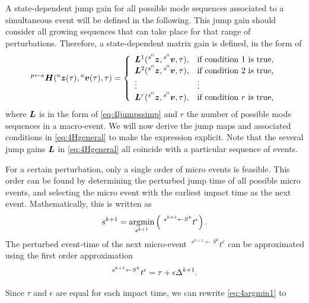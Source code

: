 \documentclass[../DC2017114Bouma.tex]{subfiles}
\begin{document}
A state-dependent jump gain for all possible mode sequences associated to a simultaneous event will be defined in the following. This jump gain should consider all growing sequences that can take place for that range of perturbations. Therefore, a state-dependent matrix gain is defined, in the form of
\begin{align}
\hspace{0cm}^{p \leftarrow a}{\boldsymbol{H}}(\hspace{0cm}^{a}{\boldsymbol{z}}(\tau),\hspace{0cm}^{a}{\boldsymbol{v}}(\tau),\tau) = \left\lbrace\begin{array}{ll}
{\boldsymbol{L}}^1(\hspace{0cm}^{s^0}{\boldsymbol{z}},\hspace{0cm}^{s^0}{\boldsymbol{v}},\tau), & \text{if condition 1 is true},\\
{\boldsymbol{L}}^2(\hspace{0cm}^{s^0}{\boldsymbol{z}},\hspace{0cm}^{s^0}{\boldsymbol{v}},\tau), & \text{if condition 2 is true},\\
\vdots & \vdots\\
{\boldsymbol{L}}^{r}(\hspace{0cm}^{s^0}{\boldsymbol{z}},\hspace{0cm}^{s^0}{\boldsymbol{v}},\tau), & \text{if condition }r\text{ is true},
\end{array}\right.\label{eq:4Hgeneral}
\end{align}
where ${\boldsymbol{L}}$ is in the form of \eqref{eq:4ljumpssimp} and $r$ the number of possible mode sequences in a macro-event. We will now derive the jump maps and associated conditions in \eqref{eq:4Hgeneral} to make the expression explicit. Note that the several jump gains ${\boldsymbol{L}}$ in \eqref{eq:4Hgeneral} all coincide with a particular sequence of events.

For a certain perturbation, only a single order of micro events is feasible. This order can be found by determining the perturbed jump time of all possible micro events, and selecting the micro event with the earliest impact time as the next event. Mathematically, this is written as
\begin{align}
s^{k+1} = \underset{s^{k+1}}{\operatorname{\text{argmin}}}\left(\ ^{s^{k+1} \leftarrow S^{k}}t^\epsilon\right).\label{eq:4argmin1}
\end{align}
The perturbed event-time of the next micro-event $\ ^{s^{k+1} \leftarrow S^{k}}t^\epsilon$ can be approximated using the first order approximation
\begin{align}
\hspace{0cm}^{s^{k+1} \leftarrow S^{k}}t^\epsilon = \tau + \epsilon\Delta^{k+1}.
\end{align}

Since $\tau$ and $\epsilon$ are equal for each impact time, we can rewrite \eqref{eq:4argmin1} to
\end{document}
